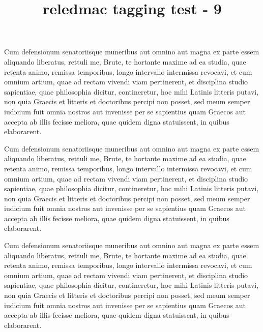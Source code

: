 \documentclass{article}
\title{reledmac tagging test - 9}
\begin{document}
\beginnumbering
\pstart%
Cum defensionum  senatoriisque muneribus aut omnino aut magna ex parte essem aliquando liberatus, rettuli me, Brute, te hortante maxime ad ea studia, quae retenta animo, remissa temporibus, longo intervallo intermissa revocavi, et cum omnium artium, quae ad rectam vivendi viam pertinerent,  et disciplina studio sapientiae, quae philosophia dicitur, contineretur, hoc mihi Latinis litteris  putavi, non quia  Graecis et litteris et doctoribus percipi non posset, sed meum semper iudicium fuit omnia nostros aut invenisse per se sapientius quam Graecos aut accepta ab illis fecisse meliora, quae quidem digna statuissent, in quibus elaborarent.
\pend

\pstart%
Cum defensionum  senatoriisque muneribus aut omnino aut magna ex parte essem aliquando liberatus, rettuli me, Brute, te hortante maxime ad ea studia, quae retenta animo, remissa temporibus, longo intervallo intermissa revocavi, et cum omnium artium, quae ad rectam vivendi viam pertinerent,  et disciplina studio sapientiae, quae philosophia dicitur, contineretur, hoc mihi Latinis litteris  putavi, non quia  Graecis et litteris et doctoribus percipi non posset, sed meum semper iudicium fuit omnia nostros aut invenisse per se sapientius quam Graecos aut accepta ab illis fecisse meliora, quae quidem digna statuissent, in quibus elaborarent.
\pend

\pstart%
Cum defensionum  senatoriisque muneribus aut omnino aut magna ex parte essem aliquando liberatus, rettuli me, Brute, te hortante maxime ad ea studia, quae retenta animo, remissa temporibus, longo intervallo intermissa revocavi, et cum omnium artium, quae ad rectam vivendi viam pertinerent,  et disciplina studio sapientiae, quae philosophia dicitur, contineretur, hoc mihi Latinis litteris  putavi, non quia  Graecis et litteris et doctoribus percipi non posset, sed meum semper iudicium fuit omnia nostros aut invenisse per se sapientius quam Graecos aut accepta ab illis fecisse meliora, quae quidem digna statuissent, in quibus elaborarent.
\pend
\end{document}
